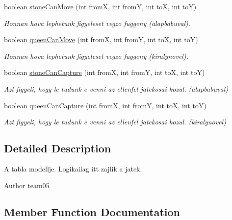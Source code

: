 \begin{DoxyCompactItemize}
boolean \hyperlink{classmodel_1_1_checkers_model_a3390a48c6e78518edd28532969fc46d6}{stone\+Can\+Move} (int from\+X, int from\+Y, int to\+X, int to\+Y)
\begin{DoxyCompactList}\small\item\em Honnan hova lephetunk figyeleset vegzo fuggeny (alapbabuval). \end{DoxyCompactList}\item 
boolean \hyperlink{classmodel_1_1_checkers_model_a598d81ff2ad93c90dfa1cf3bcad5422c}{queen\+Can\+Move} (int from\+X, int from\+Y, int to\+X, int to\+Y)
\begin{DoxyCompactList}\small\item\em Honnan hova lephetunk figyeleset vegzo fuggeny (kiralynovel). \end{DoxyCompactList}\item 
boolean \hyperlink{classmodel_1_1_checkers_model_aaafda9b9ae1510b65a7c1a576255a5b0}{stone\+Can\+Capture} (int from\+X, int from\+Y, int to\+X, int to\+Y)
\begin{DoxyCompactList}\small\item\em Azt figyeli, hogy le tudunk e venni az ellenfel jatekosai kozul. (alapbabuval) \end{DoxyCompactList}\item 
boolean \hyperlink{classmodel_1_1_checkers_model_ab9109be8e090812d614b3aa9f8cf3a7b}{queen\+Can\+Capture} (int from\+X, int from\+Y, int to\+X, int to\+Y)
\begin{DoxyCompactList}\small\item\em Azt figyeli, hogy le tudunk e venni az ellenfel jatekosai kozul. (kiralynovel) \end{DoxyCompactList}\end{DoxyCompactItemize}


\subsection{Detailed Description}
A tabla modellje. Logikailag itt zajlik a jatek. 

\begin{DoxyAuthor}{Author}
team05 
\end{DoxyAuthor}


\subsection{Member Function Documentation}
\hypertarget{classmodel_1_1_checkers_model_a3c802fe132a08baddf712e09df96cab9}{}
